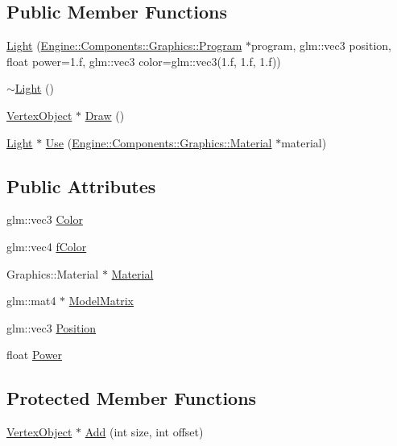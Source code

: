 \subsection*{Public Member Functions}
\begin{DoxyCompactItemize}
\item 
\mbox{\hyperlink{classLight_af33c52703fccd3142a2826893027884c}{Light}} (\mbox{\hyperlink{classEngine_1_1Components_1_1Graphics_1_1Program}{Engine\+::\+Components\+::\+Graphics\+::\+Program}} $\ast$program, glm\+::vec3 position, float power=1.f, glm\+::vec3 color=glm\+::vec3(1.f, 1.f, 1.f))
\item 
\mbox{\hyperlink{classLight_ad0e59fad13bb6cfadc25b2c477e9ddc7}{$\sim$\+Light}} ()
\item 
\mbox{\hyperlink{classEngine_1_1Components_1_1Objects_1_1VertexObject_a2cd67c7ea4baefd945c5045d2a775a5d}{Vertex\+Object}} $\ast$ \mbox{\hyperlink{classEngine_1_1Components_1_1Objects_1_1VertexObject_a53a8f546ee082720579e2c33be6cedec}{Draw}} ()
\item 
\mbox{\hyperlink{classLight}{Light}} $\ast$ \mbox{\hyperlink{classLight_a3ee17fe1c669589285bd5c8b29b13721}{Use}} (\mbox{\hyperlink{classEngine_1_1Components_1_1Graphics_1_1Material}{Engine\+::\+Components\+::\+Graphics\+::\+Material}} $\ast$material)
\end{DoxyCompactItemize}
\subsection*{Public Attributes}
\begin{DoxyCompactItemize}
\item 
glm\+::vec3 \mbox{\hyperlink{classLight_ae5e1e9cb633cea9ad892e644354bd6d1}{Color}}
\item 
glm\+::vec4 \mbox{\hyperlink{classLight_a2dc72d90843d70b86165cc11c57cc2c9}{f\+Color}}
\item 
Graphics\+::\+Material $\ast$ \mbox{\hyperlink{classEngine_1_1Components_1_1Objects_1_1VertexObject_a86c1fced4cdc5e59a66a635390a17eca}{Material}}
\item 
glm\+::mat4 $\ast$ \mbox{\hyperlink{classEngine_1_1Objects_1_1Object_acf41cc091fa270053245ed26bc28c8a4}{Model\+Matrix}}
\item 
glm\+::vec3 \mbox{\hyperlink{classLight_ab6a04fde7b96f06ab935cd1d53b91e0b}{Position}}
\item 
float \mbox{\hyperlink{classLight_a161f4944da390d9bc388091bafd59fe3}{Power}}
\end{DoxyCompactItemize}
\subsection*{Protected Member Functions}
\begin{DoxyCompactItemize}
\item 
\mbox{\hyperlink{classEngine_1_1Components_1_1Objects_1_1VertexObject_a2cd67c7ea4baefd945c5045d2a775a5d}{Vertex\+Object}} $\ast$ \mbox{\hyperlink{classEngine_1_1Components_1_1Objects_1_1VertexObject_a18550cae56ca1066792528a7dcf5d28a}{Add}} (int size, int offset)
\end{DoxyCompactItemize}
